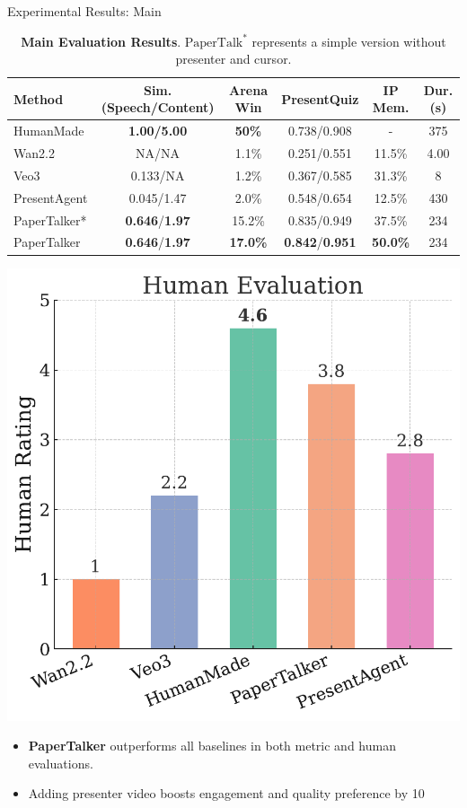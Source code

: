 \documentclass{beamer}
\newcommand{\alertterm}[1]{\alert{\textbf{#1}}}
\begin{document}
\begin{frame}{Experimental Results: Main}
  \begin{table}[ht]
    \centering
    \tiny
    \label{tab:main_result}
    \caption{\textbf{Main Evaluation Results}. $\text{PaperTalk}^{*}$ represents a simple version without presenter and cursor.}
    \begin{tabular}{l c c c c c}
      \toprule
      Method & Sim. (Speech/Content) & Arena Win & PresentQuiz & IP Mem. & Dur. (s)\\
      \midrule
      HumanMade & \alertterm{1.00/5.00}  & \alertterm{50\%} & 0.738/0.908 & - & 375\\
      \midrule
      Wan2.2~\cite{wan} & NA/NA & 1.1\% & 0.251/0.551 & 11.5\% & 4.00\\
      Veo3      & 0.133/NA   & 1.2\%  & 0.367/0.585 & 31.3\% & 8\\
      PresentAgent & 0.045/1.47 & 2.0\%  & 0.548/0.654 & 12.5\% & 430\\
      PaperTalker* & \alertterm{0.646}/\alertterm{1.97} & 15.2\% & 0.835/0.949 & 37.5\% & 234\\
      PaperTalker & \alertterm{0.646}/\alertterm{1.97} & \alertterm{17.0\%} & \alertterm{0.842}/\alertterm{0.951} & \alertterm{50.0\%} & 234\\
      \bottomrule
    \end{tabular}
  \end{table}
  \vspace{0.1cm}
  \begin{minipage}{0.5\linewidth}
    \centering
    \includegraphics[width=0.7\linewidth]{figure/human_evaluation_bar.pdf}
  \end{minipage}%
  \hfill
  \begin{minipage}{0.45\linewidth}
    {\scriptsize
     \begin{itemize}
      \item \alertterm{PaperTalker} outperforms all baselines in both metric and human evaluations.
      \item Adding presenter video boosts engagement and quality preference by 10%
      \end{itemize}
    }
  \end{minipage}
\end{frame}
\end{document}

